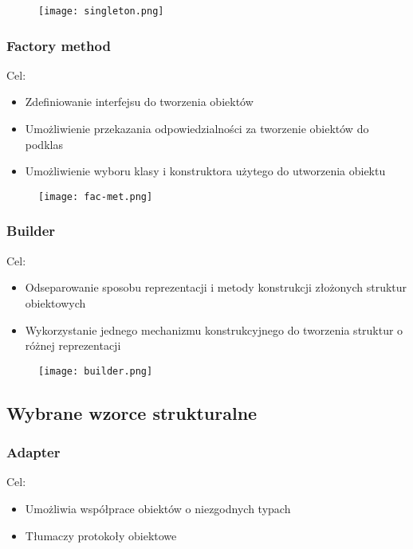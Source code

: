 \documentclass[a4paper]{article}
\begin{document}
\begin{figure}[!h]
    \texttt{[image: singleton.png]}
\end{figure}

    \subsubsection{Factory method}
    Cel:
    \begin{itemize}
        \item Zdefiniowanie interfejsu do tworzenia obiektów
        \item Umożliwienie przekazania odpowiedzialności za tworzenie obiektów
        do podklas
        \item Umożliwienie wyboru klasy i konstruktora użytego do utworzenia
        obiektu
\end{itemize}

\begin{figure}[!h]
    \texttt{[image: fac-met.png]}
\end{figure}


    \subsubsection{Builder}
    Cel:
    \begin{itemize}
        \item Odseparowanie sposobu reprezentacji i metody konstrukcji
        złożonych struktur obiektowych
        \item Wykorzystanie jednego mechanizmu konstrukcyjnego do tworzenia
        struktur o różnej reprezentacji
\end{itemize}


\begin{figure}[!h]
    \texttt{[image: builder.png]}
\end{figure}



\subsection{Wybrane wzorce strukturalne}

    \subsubsection{Adapter}
    Cel:
    \begin{itemize}
        \item Umożliwia współprace obiektów o niezgodnych typach
        \item Tłumaczy protokoły obiektowe
\end{itemize}
\end{document}
